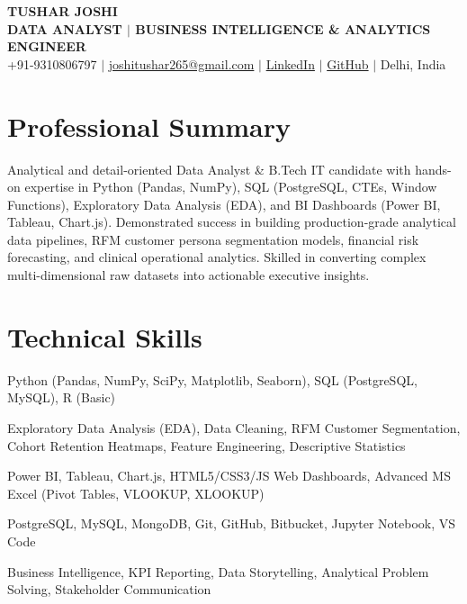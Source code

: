 \documentclass[a4paper,10pt]{article}
\begin{document}
\begin{center}
    {\Huge \bfseries TUSHAR JOSHI} \\[4pt]
    {\color{accent} \bfseries DATA ANALYST $|$ BUSINESS INTELLIGENCE \& ANALYTICS ENGINEER} \\[4pt]
    +91-9310806797 $|$ \href{mailto:joshitushar265@gmail.com}{joshitushar265@gmail.com} $|$ \href{https://linkedin.com/in/tushar-joshi-02abab230}{LinkedIn} $|$ \href{https://github.com/TusharJoshi7}{GitHub} $|$ Delhi, India
\end{center}

\section{Professional Summary}
Analytical and detail-oriented Data Analyst \& B.Tech IT candidate with hands-on expertise in Python (Pandas, NumPy), SQL (PostgreSQL, CTEs, Window Functions), Exploratory Data Analysis (EDA), and BI Dashboards (Power BI, Tableau, Chart.js). Demonstrated success in building production-grade analytical data pipelines, RFM customer persona segmentation models, financial risk forecasting, and clinical operational analytics. Skilled in converting complex multi-dimensional raw datasets into actionable executive insights.

\section{Technical Skills}
\begin{description}[font=\normalfont\bfseries, leftmargin=0pt]
    \item[Programming \& Analytics:] Python (Pandas, NumPy, SciPy, Matplotlib, Seaborn), SQL (PostgreSQL, MySQL), R (Basic)
    \item[Data Modeling \& Analytics:] Exploratory Data Analysis (EDA), Data Cleaning, RFM Customer Segmentation, Cohort Retention Heatmaps, Feature Engineering, Descriptive Statistics
    \item[BI \& Visualization:] Power BI, Tableau, Chart.js, HTML5/CSS3/JS Web Dashboards, Advanced MS Excel (Pivot Tables, VLOOKUP, XLOOKUP)
    \item[Databases \& Tools:] PostgreSQL, MySQL, MongoDB, Git, GitHub, Bitbucket, Jupyter Notebook, VS Code
    \item[Core Competencies:] Business Intelligence, KPI Reporting, Data Storytelling, Analytical Problem Solving, Stakeholder Communication
\end{description}
\end{document}
